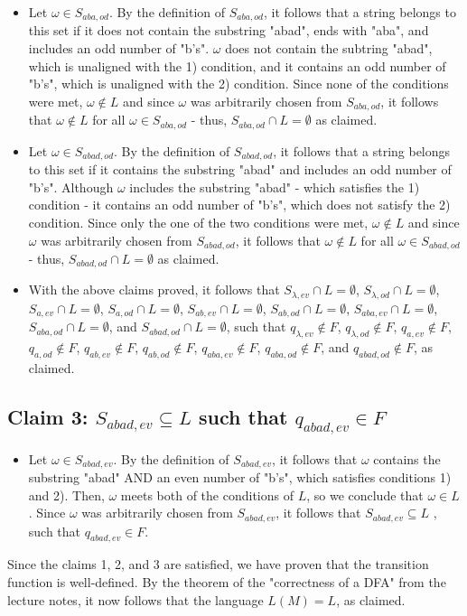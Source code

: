 \documentclass{article}
\begin{document}
\begin{itemize}
    \item Let $\omega \in S_{aba,od}$. By the definition of $S_{aba,od}$, it follows that a string belongs to this set if it does not contain the substring "abad", ends with "aba", and includes an odd number of "b's". 
    $\omega$ does not contain the subtring "abad", which is unaligned with the 1) condition, and it contains an odd number of "b's", which is unaligned with the 2) condition. Since none of the conditions were met, 
    $\omega \notin L$ and since $\omega$ was arbitrarily chosen from $S_{aba,od}$, it follows that $\omega \notin L$ for all $\omega \in S_{aba,od}$ - thus, $S_{aba,od} \cap L = \emptyset$ as claimed.

    \item Let $\omega \in S_{abad,od}$. By the definition of $S_{abad,od}$, it follows that a string belongs to this set if it contains the substring "abad" and includes an odd number of "b's". 
    Although $\omega$ includes the substring "abad" - which satisfies the 1) condition - it contains an odd number of "b's", which does not satisfy the 2) condition. Since only the one of the two conditions were met, 
    $\omega \notin L$ and since $\omega$ was arbitrarily chosen from $S_{abad,od}$, it follows that $\omega \notin L$ for all $\omega \in S_{abad,od}$ - thus, $S_{abad,od} \cap L = \emptyset$ as claimed.

    \item With the above claims proved, it follows that $S_{\lambda,ev} \cap L = \emptyset$, $S_{\lambda,od} \cap L = \emptyset$, $S_{a,ev} \cap L = \emptyset$, $S_{a,od} \cap L = \emptyset$, $S_{ab,ev} \cap L = \emptyset$, 
    $S_{ab,od} \cap L = \emptyset$, $S_{aba,ev} \cap L = \emptyset$, $S_{aba,od} \cap L = \emptyset$, and $S_{abad,od} \cap L = \emptyset$, such that $q_{\lambda,ev} \notin F$, $q_{\lambda,od} \notin F$, 
    $q_{a,ev} \notin F$, $q_{a,od} \notin F$, $q_{ab,ev} \notin F$, $q_{ab,od} \notin F$, $q_{aba,ev} \notin F$, $q_{aba,od} \notin F$, and $q_{abad,od} \notin F$, as claimed.
\end{itemize}
\subsection*{Claim 3: $S_{abad,ev} \subseteq L$ such that $q_{abad,ev} \in F$}
\begin{itemize}
    \item Let $\omega \in S_{abad,ev}$. By the definition of $S_{abad,ev}$, it follows that $\omega$ contains the substring "abad" AND an even number of "b's", which satisfies conditions 
    1) and 2). Then, $\omega$ meets both of the conditions of $L$, so we conclude that $\omega \in L$. Since $\omega$ was arbitrarily chosen from $S_{abad,ev}$, it follows that $S_{abad,ev} \subseteq L$
    , such that $q_{abad,ev} \in F$.
\end{itemize}

\noindent
Since the claims 1, 2, and 3 are satisfied, we have proven that the transition function is well-defined. By the theorem of the "correctness of a DFA" from the lecture notes, it now follows that the language $L(M) = L$, 
as claimed.
\end{document}
